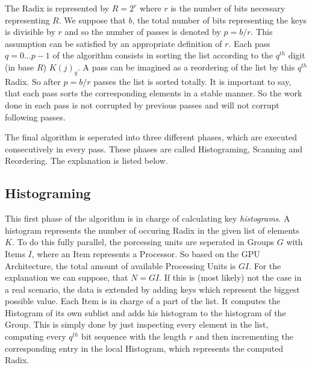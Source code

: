 \documentclass{llncs}
\begin{document}
The Radix is represented by $R = 2^r$ where $r$ is the number of bits necessary representing $R$. We suppose that $b$, the total number of bits representing the keys is divisible by $r$ and so the number of passes is denoted by $p = b/r$. This assumption can be satisfied by an appropriate definition of $r$. Each pass $q=0 \dots p-1$ of the algorithm consists in sorting the list according to the $q^{th}$ digit (in base $R$) $K(j)_q$. A pass can be imagined as a reordering of the list by this $q^{th}$ Radix. So after $p = b/r$ passes the list is sorted totally. It is important to say, that each pass sorts the corresponding elements in a stable manner. So the work done in each pass is not corrupted by previous passes and will not corrupt following passes.

The final algorithm is seperated into three different phases, which are executed consecutively in every pass. These phases are called Histograming, Scanning and Reordering. The explanation is listed below.



\subsection{Histograming}
This first phase of the algorithm is in charge of calculating key \textit{histograms}. A histogram represents the number of occuring Radix in the given list of elements $K$. To do this fully parallel, the porcessing units are seperated in Groups $G$ with Items $I$, where an Item represents a Processor. So based on the GPU Architecture, the total amount of available Processing Units is $GI$. For the explanation we can suppose, that $N=GI$. If this is (most likely) not the case in a real scenario, the data is extended by adding keys which represent the biggest possible value. Each Item is in charge of a part of the list. It computes the Histogram of its own sublist and adds his histogram to the histogram of the Group. This is simply done by just inspecting every element in the list, computing every $q^{th}$ bit sequence with the length $r$ and then incrementing the corresponding entry in the local Histogram, which represents the computed Radix.

\end{document}
